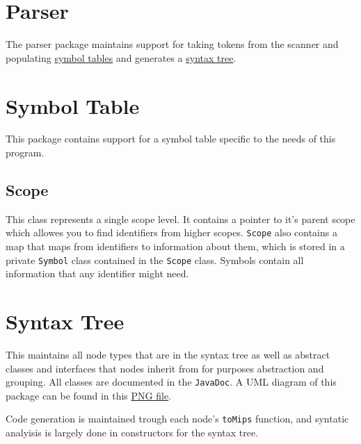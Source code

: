\documentclass{article}
\def\syntaxtreeUML{SyntaxTreeUML.png}
\begin{document}
\section{Parser} \label{parser}
The parser package maintains support for taking tokens from the scanner and populating \hyperref[symboltable]{symbol tables} and generates a \hyperref[syntaxtree]{syntax tree}.

\section{Symbol Table} \label{symboltable}
This package contains support for a symbol table specific to the needs of this program.

\subsection{Scope}
This class represents a single scope level. It contains a pointer to it's parent scope which allowes you to find identifiers from higher scopes. \texttt{Scope} also contains a map that maps from identifiers to information about them, which is stored in a private \texttt{Symbol} class contained in the \texttt{Scope} class. Symbols contain all information that any identifier might need.

\section{Syntax Tree} \label{syntaxtree}
This maintains all node types that are in the syntax tree as well as abstract classes and interfaces that nodes inherit from for purposes abstraction and grouping. All classes are documented in the \texttt{JavaDoc}. A UML diagram of this package can be found in this \href{\syntaxtreeUML}{PNG file}.

Code generation is maintained trough each node's \texttt{toMips} function, and syntatic analyisis is largely done in constructors for the syntax tree.
\end{document}
